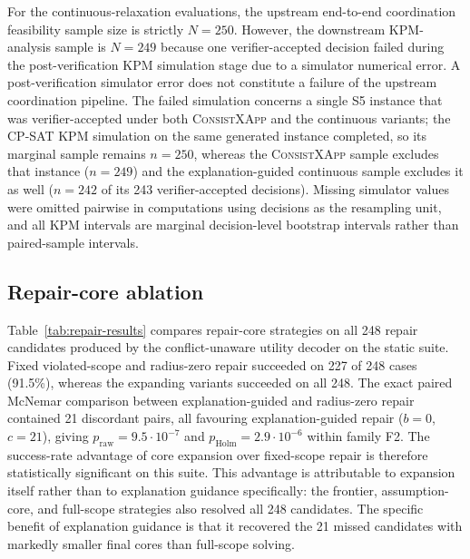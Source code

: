 \documentclass[pdflatex,sn-mathphys-num,iicol,oneside]{sn-jnl}
\newcommand{\method}{\textsc{ConsistXApp}\xspace}
\newcommand{\cpsat}{\textsc{CP-SAT}\xspace}
\begin{document}
For the continuous-relaxation evaluations, the upstream end-to-end coordination feasibility sample size is strictly $N=250$. However, the downstream KPM-analysis sample is $N=249$ because one verifier-accepted decision failed during the post-verification KPM simulation stage due to a simulator numerical error. A post-verification simulator error does not constitute a failure of the upstream coordination pipeline. The failed simulation concerns a single S5 instance that was verifier-accepted under both \method and the continuous variants; the \cpsat KPM simulation on the same generated instance completed, so its marginal sample remains $n=250$, whereas the \method sample excludes that instance ($n=249$) and the explanation-guided continuous sample excludes it as well ($n=242$ of its 243 verifier-accepted decisions). Missing simulator values were omitted pairwise in computations using decisions as the resampling unit, and all KPM intervals are marginal decision-level bootstrap intervals rather than paired-sample intervals.

\subsection{Repair-core ablation}

Table~\ref{tab:repair-results} compares repair-core strategies on all 248 repair candidates produced by the conflict-unaware utility decoder on the static suite. Fixed violated-scope and radius-zero repair succeeded on 227 of 248 cases (91.5\%), whereas the expanding variants succeeded on all 248. The exact paired McNemar comparison between explanation-guided and radius-zero repair contained 21 discordant pairs, all favouring explanation-guided repair ($b=0$, $c=21$), giving $p_{\mathrm{raw}}=9.5\cdot 10^{-7}$ and $p_{\mathrm{Holm}}=2.9\cdot 10^{-6}$ within family F2. The success-rate advantage of core expansion over fixed-scope repair is therefore statistically significant on this suite. This advantage is attributable to expansion itself rather than to explanation guidance specifically: the frontier, assumption-core, and full-scope strategies also resolved all 248 candidates. The specific benefit of explanation guidance is that it recovered the 21 missed candidates with markedly smaller final cores than full-scope solving.
\end{document}
